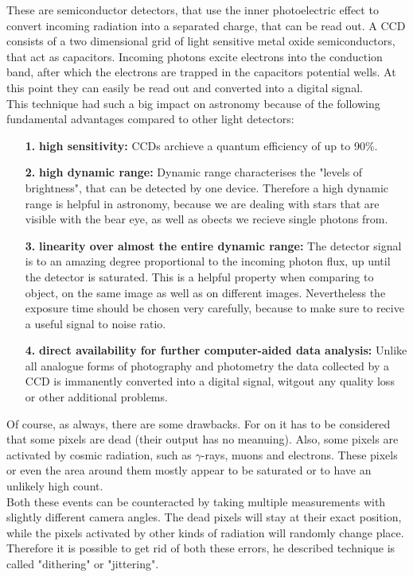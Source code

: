  These are semiconductor detectors, that use the inner photoelectric effect to convert incoming radiation into a separated charge, that can be read out. A CCD consists of a two dimensional grid of light sensitive metal oxide semiconductors, that act as capacitors. Incoming photons excite electrons into the conduction band, after which the electrons are trapped in the capacitors potential wells. At this point they can easily be read out and converted into a digital signal. \\
This technique had such a big impact on astronomy because of the following fundamental advantages compared to other light detectors:

\begin{enumerate}
	\item[\textbf{1.}]\textbf{high sensitivity:} CCDs archieve a quantum efficiency of up to 90\%.
	\item[\textbf{2.}]\textbf{high dynamic range:} Dynamic range characterises the "levels of brightness", that can be detected by one device. Therefore a high dynamic range is helpful in astronomy, because we are dealing with stars that are visible with the bear eye, as well as obects we recieve single photons from.
	\item[\textbf{3.}]\textbf{linearity over almost the entire dynamic range:} The detector signal is to an amazing degree proportional to the incoming photon flux, up until the detector is saturated. This is a helpful property when comparing to object, on the same image as well as on different images. Nevertheless the exposure time should be chosen very carefully, because to make sure to recive a useful signal to noise ratio.
	\item[\textbf{4.}] \textbf{direct availability for further computer-aided data analysis:} Unlike all analogue forms of photography and photometry the data collected by a CCD is immanently converted into a digital signal, witgout any quality loss or other additional problems. 
\end{enumerate}

Of course, as always, there are some drawbacks. For on it has to be considered that some pixels are dead (their output has no meanuing). Also, some pixels are activated by cosmic radiation, such as $\gamma$-rays, muons and electrons. These pixels or even the area around them mostly appear to be saturated or to have an unlikely high count.\\
Both these events can be counteracted by taking multiple measurements with slightly different camera angles. The dead pixels will stay at their exact position, while the pixels activated by other kinds of radiation will randomly change place. Therefore it is possible to get rid of both these errors, he described technique is called "dithering" or "jittering".

